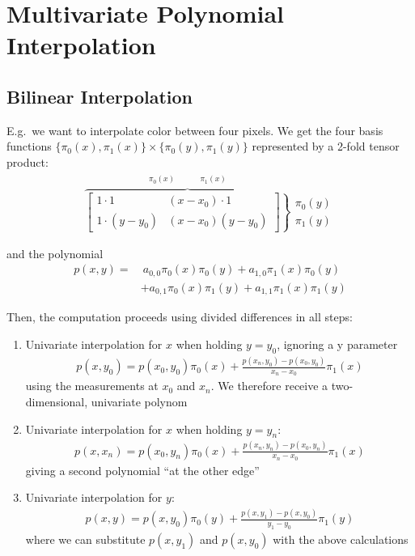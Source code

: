 \section{Multivariate Polynomial Interpolation}

\subsection{Bilinear Interpolation}

E.g.\ we want to interpolate color between four pixels.
We get the four basis functions $\{\pi_0(x), \pi_1(x)\} \times \{\pi_0(y), \pi_1(y)\}$
represented by a 2-fold tensor product:
\begin{align*}
    \overbrace{
        \left.
        \begin{bmatrix}
            1\cdot 1       & (x-x_0)\cdot 1 \\
            1\cdot (y-y_0) & (x-x_0)(y-y_0)
        \end{bmatrix}
        \right\}
    }^{\begin{matrix}
           \pi_0(x) & & & & \pi_1(x)
    \end{matrix}}
    \begin{matrix}
        \pi_0(y) \\
        \pi_1(y)
    \end{matrix}
\end{align*}

and the polynomial
\begin{align*}
    p(x,y) = &\ a_{0,0}\pi_0(x)\pi_0(y)
    + a_{1,0}\pi_1(x)\pi_0(y) \\
    \ & + a_{0,1}\pi_0(x)\pi_1(y)
    + a_{1,1}\pi_1(x)\pi_1(y)
\end{align*}

Then, the computation proceeds using divided differences in all steps:
\begin{enumerate}
    \item{
        Univariate interpolation for $x$ when holding $y=y_0$,
        ignoring a y parameter
        \begin{align*}
            p(x,y_0) = p(x_0,y_0)\pi_0(x) + \frac{p(x_n,y_0) - p(x_0, y_0)}{x_n - x_0}\pi_1(x)
        \end{align*}
        using the measurements at $x_0$ and $x_n$.
        We therefore receive a two-dimensional, univariate polynom
    }
    \item{
        Univariate interpolation for $x$ when holding $y=y_n$:
        \begin{align*}
            p(x,x_n) = p(x_0,y_n)\pi_0(x) + \frac{p(x_n,y_n) - p(x_0, y_n)}{x_n - x_0}\pi_1(x)
        \end{align*}
        giving a second polynomial ``at the other edge''
    }
    \item{
        Univariate interpolation for $y$:
        \begin{align*}
            p(x,y)=p(x,y_0)\pi_0(y)+\frac{p(x,y_1) - p(x,y_0)}{y_1-y_0}\pi_1(y)
        \end{align*}
        where we can substitute $p(x,y_1)$ and $p(x,y_0)$ with the above calculations
    }
\end{enumerate}
